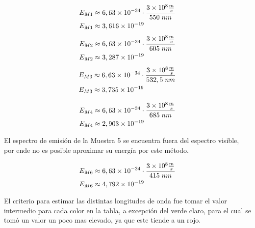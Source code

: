 \documentclass[12pt]{report}
\begin{document}
\begin{minipage}[t]{0.48\textwidth}
  $$
  \begin{aligned}
    E_{M1}& \approx 6,63\times10^{-34}\cdot \frac{3\times10^8 \frac{m}{s} }{ 550 \hspace{1mm}nm}\\
    E_{M1}& \approx 3,616 \times10^{-19}
  \end{aligned}
  $$
  \vspace{5mm}
  $$
  \begin{aligned}
    E_{M2}& \approx 6,63\times10^{-34}\cdot \frac{3\times10^8 \frac{m}{s} }{ 605 \hspace{1mm}nm}\\
    E_{M2}& \approx  3,287 \times10^{-19}
  \end{aligned}
  $$
  \vspace{5mm}
  $$
  \begin{aligned}
    E_{M3}& \approx 6,63\times10^{-34}\cdot \frac{3\times10^8 \frac{m}{s} }{ 532,5 \hspace{1mm}nm}\\
    E_{M3}& \approx  3,735 \times10^{-19}
  \end{aligned}
  $$
\end{minipage}
\hfill
\begin{minipage}[t]{0.48\textwidth}
  $$
  \begin{aligned}
    E_{M4}& \approx 6,63\times10^{-34}\cdot \frac{3\times10^8 \frac{m}{s} }{ 685 \hspace{1mm}nm}\\
    E_{M4}& \approx 2,903 \times10^{-19}
  \end{aligned}
  $$
  \vspace{2mm}

  El espectro de emisión de la Muestra 5 se encuentra fuera del espectro visible, por ende 
  no es posible aproximar su energía por este método.

  \vspace{2mm}
  $$
  \begin{aligned}
    E_{M6}& \approx 6,63\times10^{-34}\cdot \frac{3\times10^8 \frac{m}{s} }{ 415 \hspace{1mm}nm}\\
    E_{M6}& \approx  4,792 \times10^{-19}
  \end{aligned}
  $$
\end{minipage}

El criterio para estimar las distintas longitudes de onda fue tomar el valor intermedio para cada
color en la tabla, a excepción del verde claro, para el cual se tomó un valor un poco mas elevado,
ya que este tiende a un rojo.
\end{document}
